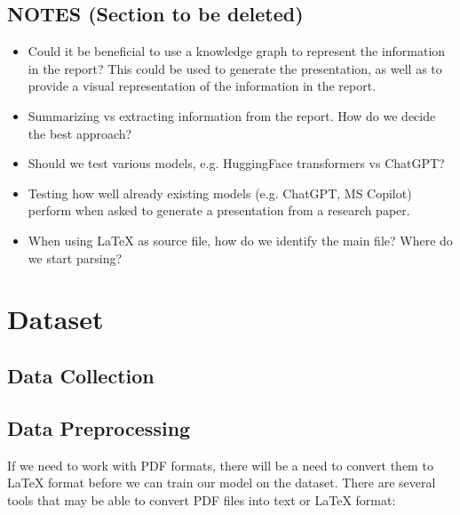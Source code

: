 \subsection{NOTES (Section to be deleted)}
\begin{itemize}
    \item Could it be beneficial to use a knowledge graph to represent the information in the report? This could be used to generate the presentation, as well as to provide a visual representation of the information in the report.
    \item Summarizing vs extracting information from the report. How do we decide the best approach?
    \item Should we test various models, e.g. HuggingFace transformers vs ChatGPT?
    \item Testing how well already existing models (e.g. ChatGPT, MS Copilot) perform when asked to generate a presentation from a research paper.
    \item When using \LaTeX{} as source file, how do we identify the main file? Where do we start parsing? 
\end{itemize}

\section{Dataset}

\subsection{Data Collection}

\subsection{Data Preprocessing}
If we need to work with PDF formats, there will be a need to convert them to \LaTeX{} format before we can train our model on the dataset. There are several tools that may be able to convert PDF files into text or \LaTeX{} format: 

